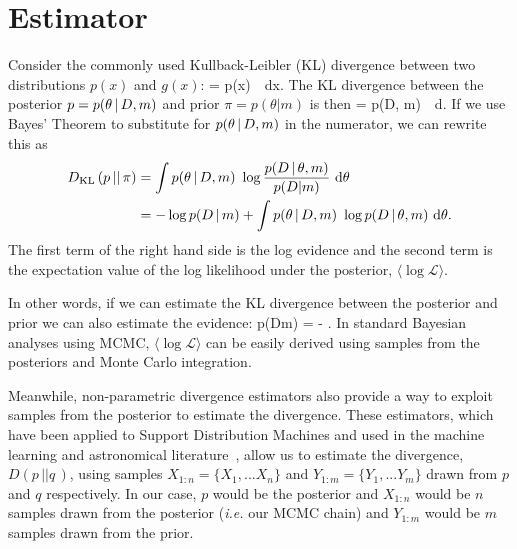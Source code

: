 \section{Estimator} \label{sec:estimator}
Consider the commonly used Kullback-Leibler (KL) divergence between two
distributions $p(x)$ and $g(x)$:
\beq
     = \int p(x)~\log{}~{\rm d}x. 
\eeq
The KL divergence between the posterior $p = p(\theta \,|\, D, m)$ and prior
$\pi = p(\theta | m)$ is then 
\beq
     = \int p(\theta \given D, m)~\log{}~{\rm d}\theta. 
\eeq
If we use Bayes' Theorem to substitute for $p(\theta \,|\, D, m)$ in the
numerator, we can rewrite this as 
\begin{align}
    D_{\rm KL}\left({p}\,||\,{\pi}\right) &= \int p(\theta \,|\, D,
    m)~\log\frac{p(D \,|\, \theta, m)}{p(D | m)}~{\rm d}\theta\\ 
        &= -\log p(D\,|\, m) + \int p(\theta \,|\, D, m)~\log p(D \,|\, \theta, m)~{\rm d}\theta. 
\end{align}
The first term of the right hand side is the log evidence and the second term
is the expectation value of the log likelihood under the posterior, $\big\langle
\log \mathcal{L} \big\rangle$. 

In other words, if we can estimate the KL divergence between the posterior and
prior we can also estimate the evidence: 
\beq \label{eq:estimator}
p(D\given m) = \big\langle \log {} \big\rangle - .
\eeq
In standard Bayesian analyses using MCMC, $\big\langle \log \mathcal{L}
\big\rangle$ can be easily derived using samples from the posteriors and Monte
Carlo integration. 

Meanwhile, non-parametric divergence estimators also provide a way to exploit
samples from the posterior to estimate the divergence. These estimators, which 
have been applied to Support Distribution Machines and used in the machine
learning and astronomical literature~\citep[\emph{e.g.}][]{poczos2011,
poczos2012, poczos2012a, xu2013, ntampaka2015, ntampaka2016,
ravanbakhsh2017, hahn2019}, allow us to estimate the divergence, $D(p\,||q\,)$, using
samples $X_{1:n} = \{ X_1, ... X_n \}$ and $Y_{1:m} = \{ Y_1, ... Y_m \}$ 
drawn from $p$ and $q$ respectively. In our case, $p$ would be the posterior
and $X_{1:n}$ would be $n$ samples drawn from the posterior (\emph{i.e.} our
MCMC chain) and $Y_{1:m}$ would be $m$ samples drawn from the prior. 

